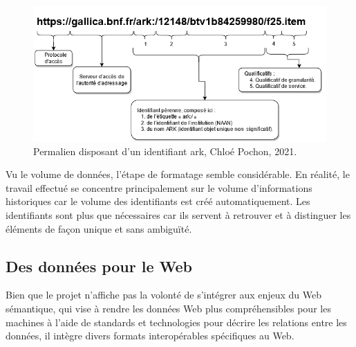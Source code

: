 \begin{figure}
    \centering
    \includegraphics[width=1\linewidth]{images/schema-ark.png}
    \caption{Permalien disposant d'un identifiant \acrshort{ark},  Chloé Pochon, 2021.}
    \label{fig:ark}
\end{figure}

Vu le volume de données, l'étape de formatage semble considérable. En réalité, le travail effectué se concentre principalement sur le volume d'informations historiques car le volume des identifiants est créé automatiquement. Les identifiants sont plus que nécessaires car ils servent à retrouver et à distinguer les éléments de façon unique et sans ambiguïté. 

\subsection{Des données pour le Web}\label{sous-section:web}
Bien que le projet n'affiche pas la volonté de s'intégrer aux enjeux du Web sémantique, qui vise à rendre les données Web plus compréhensibles pour les machines à l'aide de standards et technologies pour décrire les relations entre les données, il intègre divers formats interopérables spécifiques au Web.

